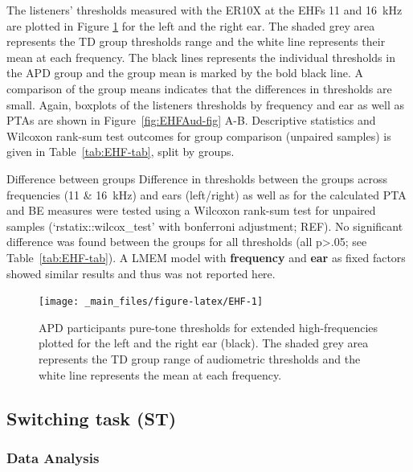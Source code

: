 \documentclass[a4paper, twoside]{templates/ociamthesis}
\begin{document}
The listeners' thresholds measured with the ER10X at the EHFs 11 and 16~kHz are plotted in Figure \ref{fig:EHF} for the left and the right ear. The shaded grey area represents the TD group thresholds range and the white line represents their mean at each frequency. The black lines represents the individual thresholds in the APD group and the group mean is marked by the bold black line. A comparison of the group means indicates that the differences in thresholds are small. Again, boxplots of the listeners thresholds by frequency and ear as well as PTAs are shown in Figure~\ref{fig:EHFAud-fig} A-B. Descriptive statistics and Wilcoxon rank-sum test outcomes for group comparison (unpaired samples) is given in Table~\ref{tab:EHF-tab}, split by groups.

\colorbox[HTML]{CCCCFF}{Difference between groups} Difference in thresholds between the groups across frequencies (11 \& 16~kHz) and ears (left/right) as well as for the calculated PTA and BE measures were tested using a Wilcoxon rank-sum test for unpaired samples (`rstatix::wilcox\_test' with bonferroni adjustment; REF). No significant difference was found between the groups for all thresholds (all p\textgreater.05; see Table~\ref{tab:EHF-tab}). A LMEM model with \textbf{frequency} and \textbf{ear} as fixed factors showed similar results and thus was not reported here.

\begin{figure}

{\centering \texttt{[image: \_main\_files/figure-latex/EHF-1]} 

}

\caption{APD participants pure-tone thresholds for extended high-frequencies plotted for the left and the right ear (black). The shaded grey area represents the TD group range of audiometric thresholds and the white line represents the mean at each frequency.}\label{fig:EHF}
\end{figure}

\hypertarget{switching-task-st-1}{%
\subsection{Switching task (ST)}\label{switching-task-st-1}}

\hypertarget{data-analysis}{%
\subsubsection*{Data Analysis}\label{data-analysis}}
\end{document}
